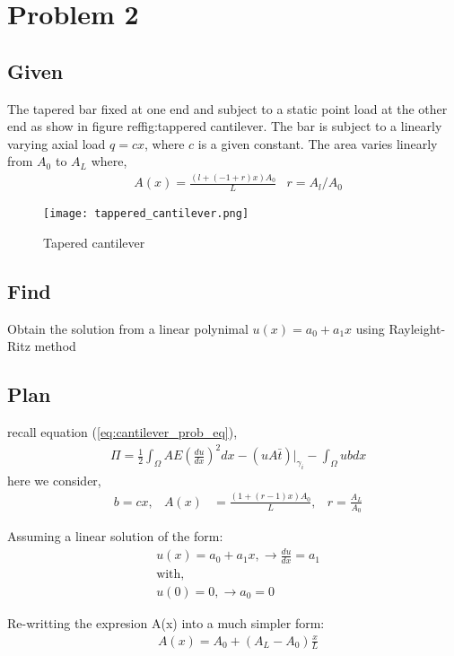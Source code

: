 \documentclass[a4paper]{memoir}
\begin{document}
\section{Problem 2}
\subsection{Given}
The tapered bar fixed at one end and subject to a static point load at the other end as show in figure ref{fig:tappered cantilever}.
The bar is subject to a linearly varying axial load $q=cx$, where $c$ is a given constant. The area varies linearly from $A_0$ to $A_L$ where,
\begin{align*}
	&A(x) = \frac{(l+(-1+r)x)A_0}{L}	& r = A_l/A_0
\end{align*}

\begin{figure}
	\centering
		\texttt{[image: tappered\_cantilever.png]}
	\caption{Tapered cantilever}
	\label{fig:tappered_cantilever}
\end{figure}

\subsection{Find}
Obtain the solution from a linear polynimal $u(x) = a_0+a_1x$ using Rayleight-Ritz method 

\subsection{Plan}
recall equation (\ref{eq:cantilever_prob_eq}),
\begin{align*}
	&\Pi = \frac{1}{2} \int_\Omega AE \left( \frac{du}{dx} \right)^2dx - (uA\bar{t})|_{\gamma_i} - \int_\Omega ubdx
\end{align*}
here we consider,
\begin{align*}
	& b = cx, & A(x) & = \frac{(1+(r-1)x)A_0}{L}, & r = \frac{A_L}{A_0}
\end{align*}

Assuming a linear solution of the form: 
\begin{align*}
	& u(x) = a_0+a_1x, \rightarrow \frac{du}{dx} = a_1 \\
	& \text{with,} \\
	& u(0) = 0, 	\rightarrow a_0 = 0
\end{align*}
 
Re-writting the expresion A(x) into a much simpler form:
\begin{align*}
	& A(x) = A_0 + (A_L-A_0)\frac{x}{L}
\end{align*}
\end{document}
